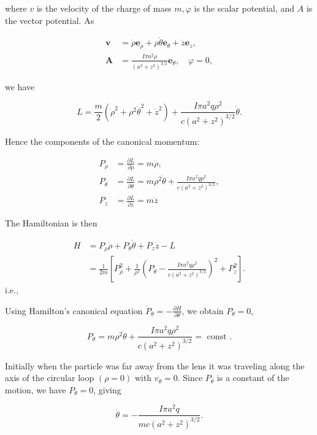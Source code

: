 \documentclass[10pt]{article}
\begin{document}
where $v$ is the velocity of the charge of mass $m, \varphi$ is the scalar potential, and $A$ is the vector potential. As

$$
\begin{aligned}
\mathbf{v} &=\dot{\rho} \mathbf{e}_{\rho}+\rho \dot{\theta} \mathbf{e}_{\theta}+\dot{z} \mathbf{e}_{z}, \\
\mathbf{A} &=\frac{I \pi a^{2} \rho}{\left(a^{2}+z^{2}\right)^{3 / 2}} \mathbf{e}_{\theta}, \quad \varphi=0,
\end{aligned}
$$

we have

$$
L=\frac{m}{2}\left(\dot{\rho}^{2}+\rho^{2} \dot{\theta}^{2}+\dot{z}^{2}\right)+\frac{I \pi a^{2} q \rho^{2}}{c\left(a^{2}+z^{2}\right)^{3 / 2}} \dot{\theta} .
$$

Hence the components of the canonical momentum:

$$
\begin{aligned}
P_{\rho} &=\frac{\partial L}{\partial \dot{\rho}}=m \dot{\rho}, \\
P_{\theta} &=\frac{\partial L}{\partial \dot{\theta}}=m \rho^{2} \dot{\theta}+\frac{I \pi a^{2} q p^{2}}{c\left(a^{2}+z^{2}\right)^{3 / 2}}, \\
P_{z} &=\frac{\partial L}{\partial \dot{z}}=m \dot{z}
\end{aligned}
$$

The Hamiltonian is then

$$
\begin{aligned}
H &=P_{\rho} \dot{\rho}+P_{\theta} \dot{\theta}+P_{z} \dot{z}-L \\
&=\frac{1}{2 m}\left[P_{\rho}^{2}+\frac{1}{\rho^{2}}\left(P_{\theta}-\frac{I \pi a^{2} q \rho^{2}}{c\left(a^{2}+z^{2}\right)^{3 / 2}}\right)^{2}+P_{z}^{2}\right] .
\end{aligned}
$$
i.e.,

 Using Hamilton's canonical equation $\dot{P}_{\theta}=-\frac{\partial H}{\partial \theta}$, we obtain $\dot{P}_{\theta}=0$,

$$
P_{\theta}=m \rho^{2} \dot{\theta}+\frac{I \pi a^{2} q \rho^{2}}{c\left(a^{2}+z^{2}\right)^{3 / 2}}=\text { const } .
$$

Initially when the particle was far away from the lens it was traveling along the axis of the circular loop $(\rho=0)$ with $v_{\theta}=0$. Since $P_{\theta}$ is a constant of the motion, we have $P_{\theta}=0$, giving

$$
\dot{\theta}=-\frac{I \pi a^{2} q}{m c\left(a^{2}+z^{2}\right)^{3 / 2}} .
$$
\end{document}

